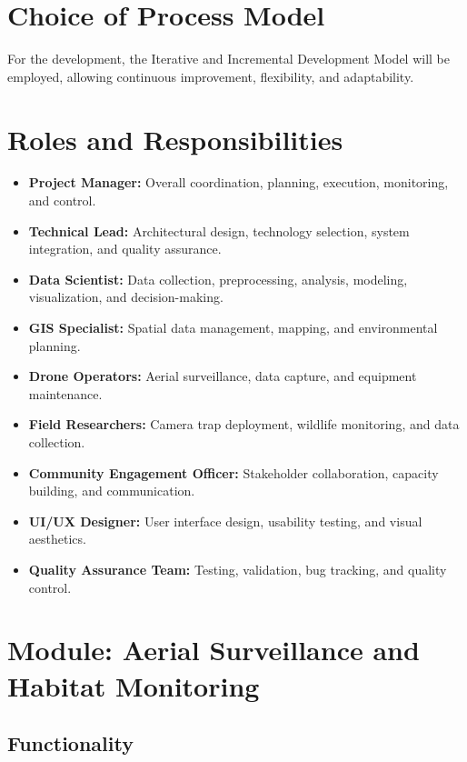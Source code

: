 \documentclass{article}
\begin{document}
\section{Choice of Process Model}

For the development, the Iterative and Incremental Development Model will be employed, allowing continuous improvement, flexibility, and adaptability.

\section{Roles and Responsibilities}

\begin{itemize}
    \item \textbf{Project Manager:} Overall coordination, planning, execution, monitoring, and control.
    \item \textbf{Technical Lead:} Architectural design, technology selection, system integration, and quality assurance.
    \item \textbf{Data Scientist:} Data collection, preprocessing, analysis, modeling, visualization, and decision-making.
    \item \textbf{GIS Specialist:} Spatial data management, mapping, and environmental planning.
    \item \textbf{Drone Operators:} Aerial surveillance, data capture, and equipment maintenance.
    \item \textbf{Field Researchers:} Camera trap deployment, wildlife monitoring, and data collection.
    \item \textbf{Community Engagement Officer:} Stakeholder collaboration, capacity building, and communication.
    \item \textbf{UI/UX Designer:} User interface design, usability testing, and visual aesthetics.
    \item \textbf{Quality Assurance Team:} Testing, validation, bug tracking, and quality control.
\end{itemize}

\section{Module: Aerial Surveillance and Habitat Monitoring}

\subsection{Functionality}
\end{document}
